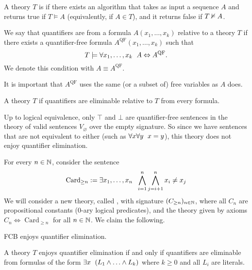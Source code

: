 
\begin{definition}
  A theory $T$ is  if there exists an algorithm that takes as
  input a sequence $A$ and returns true if $T \models A$ (equivalently, if $A
  \in T$), and it returns false if $T \nvDash A$.
\end{definition}

\begin{definition}
  We say that quantifiers are  from a formula $A(x_1, \ldots,
  x_k)$ relative to a theory $T$ if there exists a quantifier-free formula
  $A^{\text{QF}}(x_1, \ldots, x_k)$ such that
  \[
	T \models \forall x_1, \ldots, x_k \;\  A \Leftrightarrow A^{\text{QF}}.
  \]
  We denote this condition with $A \equiv A^{\text{QF}}$.
\end{definition}

\begin{remark}
  It is important that $A^{\text{QF}}$ uses the same (or a subset of) free
  variables as $A$ does.
\end{remark}

\begin{definition}
  A theory $T$  if quantifiers are
  eliminable relative to $T$ from every formula.
\end{definition}

Up to logical equivalence, only $\top$ and $\bot$ are quantifier-free sentences
in the theory of valid sentences $V_\varnothing$ over the empty signature.
So since we have sentences that are not equivalent to either (such as $\forall x
\forall y \;\  x = y$), this theory does not enjoy quantifier elimination.

For every $n \in \mathbb{N}$, consider the sentence
\[
  \operatorname{Card}_{\ge n} := \exists x_1, \ldots, x_n \;\ 
  \bigwedge_{i=1}^n \bigwedge_{j = i+1}^n x_i \ne x_j
\]
We will consider a new theory, called , with
signature $(C_{\ge n})_{n \in \mathbb{N}}$, where all $C_n$ are propositional constants
($0$-ary logical predicates), and the theory given by axioms $C_n \iff
\operatorname{Card}_{\ge n}$ for all $n \in \mathbb{N}$.
We claim the following.

\begin{theorem}
  \label{theorem:log-03-fcb-elimination}
  FCB enjoys quantifier elimination.
\end{theorem}

\begin{proposition}
  A theory $T$ enjoys quantifier elimination if and only if quantifiers are
  eliminable from formulas of the form $\exists x \;\  (L_1 \land \ldots \land
  L_k)$ where $k \ge 0$ and all $L_i$ are literals.
\end{proposition}

